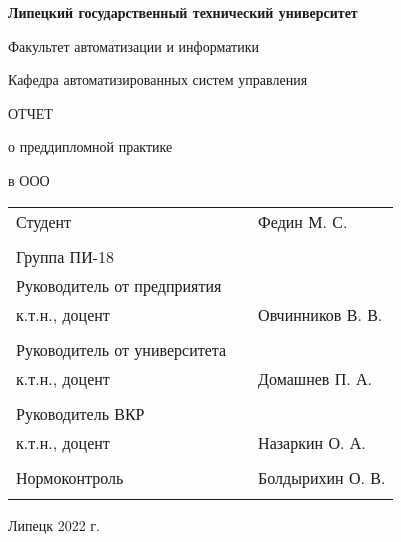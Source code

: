 \begin{center}
    \textbf{Липецкий государственный технический университет}

    Факультет автоматизации и информатики

    Кафедра автоматизированных систем управления
\end{center}

\vfill

\begin{center}
    ОТЧЕТ

    о преддипломной практике

    в ООО 
\end{center}
\vfill

\noindent\begin{tabularx}{\textwidth}{lCl}
    Студент & & Федин М. С. \\
     \\
    Группа ПИ-18 & & \\
    Руководитель от предприятия & & \\
    к.т.н., доцент & & Овчинников В. В. \\
     \\
    Руководитель от университета & & \\
    к.т.н., доцент & & Домашнев П. А. \\
     \\
    Руководитель ВКР & & \\
    к.т.н., доцент & & Назаркин О. А. \\
     \\
    Нормоконтроль & & Болдырихин О. В. \\
     \\
\end{tabularx}

\vfill

\begin{center}
    Липецк 2022 г.
\end{center}
\thispagestyle{empty}
\clearpage
